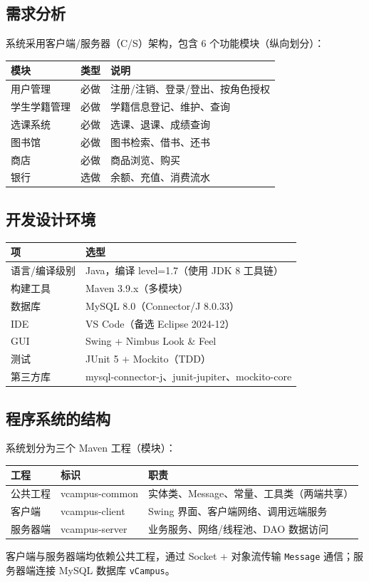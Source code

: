 \documentclass[12pt,a4paper]{ctexart}
\begin{document}
\subsection{需求分析}
系统采用客户端/服务器（C/S）架构，包含 6 个功能模块（纵向划分）：
\begin{center}
\begin{tabular}{l l l}
\toprule
\textbf{模块} & \textbf{类型} & \textbf{说明} \\
\midrule
用户管理 & 必做 & 注册/注销、登录/登出、按角色授权 \\
学生学籍管理 & 必做 & 学籍信息登记、维护、查询 \\
选课系统 & 必做 & 选课、退课、成绩查询 \\
图书馆 & 必做 & 图书检索、借书、还书 \\
商店 & 必做 & 商品浏览、购买 \\
银行 & 选做 & 余额、充值、消费流水 \\
\bottomrule
\end{tabular}
\end{center}

\subsection{开发设计环境}
\begin{center}
\begin{tabular}{l l}
\toprule
\textbf{项} & \textbf{选型} \\
\midrule
语言/编译级别 & Java，编译 level=1.7（使用 JDK 8 工具链） \\
构建工具 & Maven 3.9.x（多模块） \\
数据库 & MySQL 8.0（Connector/J 8.0.33） \\
IDE & VS Code（备选 Eclipse 2024-12） \\
GUI & Swing + Nimbus Look \& Feel \\
测试 & JUnit 5 + Mockito（TDD） \\
第三方库 & mysql-connector-j、junit-jupiter、mockito-core \\
\bottomrule
\end{tabular}
\end{center}

\subsection{程序系统的结构}
系统划分为三个 Maven 工程（模块）：
\begin{center}
\begin{tabular}{l l l}
\toprule
\textbf{工程} & \textbf{标识} & \textbf{职责} \\
\midrule
公共工程 & vcampus-common & 实体类、Message、常量、工具类（两端共享） \\
客户端 & vcampus-client & Swing 界面、客户端网络、调用远端服务 \\
服务器端 & vcampus-server & 业务服务、网络/线程池、DAO 数据访问 \\
\bottomrule
\end{tabular}
\end{center}
客户端与服务器端均依赖公共工程，通过 Socket + 对象流传输 \texttt{Message} 通信；服务器端连接 MySQL 数据库 \texttt{vCampus}。
\end{document}
